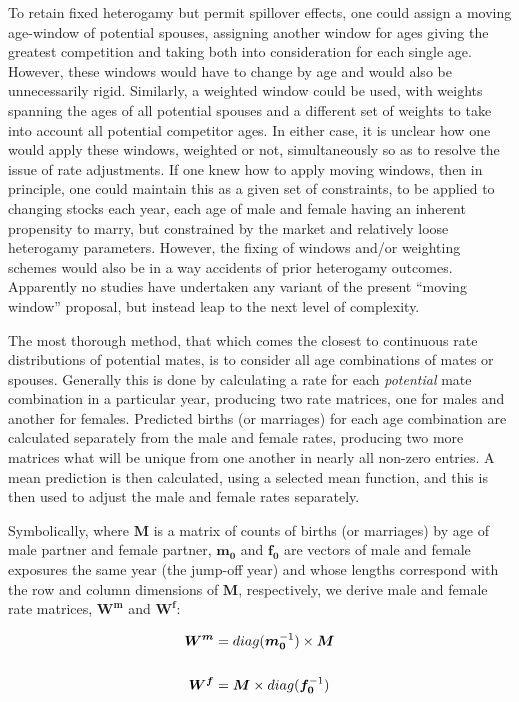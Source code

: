 \documentclass[reqno,12pt,oneside,a4paper]{report} %
\theoremstyle{plain}
\theoremstyle{definition}
\theoremstyle{remark}
\numberwithin{theorem}{chapter}     %
\begin{document}
To retain fixed heterogamy but permit spillover effects, one could assign a moving age-window of potential spouses, assigning another window for ages giving the greatest competition and taking both into consideration for each single age. However, these windows would have to change by age and would also be unnecessarily rigid. Similarly, a weighted window could be used, with weights spanning the ages of all potential spouses and a different set of weights to take into account all potential competitor ages. In either case, it is unclear how one would apply these windows, weighted or not, simultaneously so as to resolve the issue of rate adjustments. If one knew how to apply moving windows, then in principle, one could maintain this as a given set of constraints, to be applied to changing stocks each year, each age of male and female having an inherent propensity to marry, but constrained by the market and relatively loose heterogamy parameters. However, the fixing of windows and/or weighting schemes would also be in a way accidents of prior heterogamy outcomes. Apparently no studies have undertaken any variant of the present ``moving window'' proposal, but instead leap to the next level of complexity.

The most thorough method, that which comes the closest to continuous rate distributions of potential mates, is to consider all age combinations of mates or spouses. Generally this is done by calculating a rate for each \textit{potential} mate combination in a particular year, producing two rate matrices, one for males and another for females. Predicted births (or marriages) for each age combination are calculated separately from the male and female rates, producing two more matrices what will be unique from one another in nearly all non-zero entries. A mean prediction is then calculated, using a selected mean function, and this is then used to adjust the male and female rates separately.

Symbolically, where $\bm{M}$ is a matrix of counts of births (or marriages) by age of male partner and female partner, $\bm{m_0}$ and $\bm{f_0}$ are vectors of male and female exposures the same year (the jump-off year) and whose lengths correspond with the row and column dimensions of $\bm{M}$, respectively, we derive male and female rate matrices, $\bm{W^m}$ and $\bm{W^f}$:

\begin{align}
\bm{W^m} &= diag(\bm{m_0}^{-1}) \times \bm{M} \notag \\ \notag \\
\bm{W^f} &= \bm{M} \times diag(\bm{f_0}^{-1})
\end{align}
\end{document}
